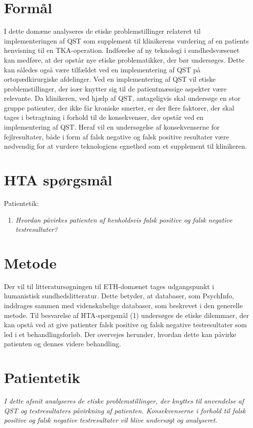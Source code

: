 \section{Formål}
I dette domæne analyseres de etiske problemstillinger relateret til implementeringen af QST som supplement til klinikerens vurdering af en patients henvisning til en TKA-operation. Indførelse af ny teknologi i sundhedsvæsenet kan medføre, at der opstår nye etiske problematikker, der bør undersøges. Dette kan således også være tilfældet ved en implementering af QST på ortopædkirurgiske afdelinger. Ved en implementering af QST vil etiske problemstillinger, der især knytter sig til de patientmæssige aspekter være relevante. Da klinikeren, ved hjælp af QST, antageligvis skal undersøge en stor gruppe patienter, der ikke får kroniske smerter, er der flere faktorer, der skal tages i betragtning i forhold til de konsekvenser, der opstår ved en implementering af QST. Heraf vil en undersøgelse af konsekvenserne for fejlresultater, både i form af falsk negative og falsk positive resultater være nødvendig for at vurdere teknologiens egnethed som et supplement til klinikeren.



\section{HTA spørgsmål}
Patientetik:
\begin{enumerate}
\item \textit{Hvordan påvirkes patienten af henholdsvis falsk positive og falsk negative testresultater?} %
\end{enumerate}


\section{Metode}
Der vil til litteratursøgningen til ETH-domænet tages udgangspunkt i humanistisk sundhedslitteratur. Dette betyder, at databaser, som PsychInfo, inddrages sammen med videnskabelige databaser, som beskrevet i den generelle metode. 
Til besvarelse af HTA-spørgsmål (1) undersøges de etiske dilemmaer, der kan opstå ved at give patienter falsk positive og falsk negative testresultater som led i et behandlingsforløb. Der overvejes herunder, hvordan dette kan påvirke patienten og dennes videre behandling.


\section{Patientetik}
\textit{I dette afsnit analyseres de etiske problemstillinger, der knyttes til anvendelse af QST og testresultaters påvirkning af patienten. Konsekvenserne i forhold til falsk positive og falsk negative testresultater vil blive undersøgt og analyseret.}


